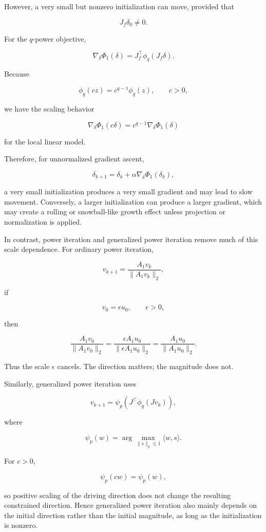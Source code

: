 \documentclass{article}
\begin{document}
However, a very small but nonzero initialization can move, provided that

\[
J_f\delta_0\neq0.
\]

For the \(q\)-power objective,

\[
\nabla_\delta \Phi_1(\delta)
=
J_f^\top\phi_q(J_f\delta).
\]

Because

\[
\phi_q(cz)=c^{q-1}\phi_q(z),
\qquad c>0,
\]

we have the scaling behavior

\[
\nabla_\delta\Phi_1(c\delta)
=
c^{q-1}\nabla_\delta\Phi_1(\delta)
\]

for the local linear model.

Therefore, for unnormalized gradient ascent,

\[
\delta_{k+1}
=
\delta_k+\alpha\nabla_\delta\Phi_1(\delta_k),
\]

a very small initialization produces a very small gradient and may lead to slow movement. Conversely, a larger initialization can produce a larger gradient, which may create a rolling or snowball-like growth effect unless projection or normalization is applied.

In contrast, power iteration and generalized power iteration remove much of this scale dependence. For ordinary power iteration,

\[
v_{k+1}
=
\frac{A_1v_k}{\|A_1v_k\|_2},
\]

if

\[
v_0=\epsilon u_0,
\qquad
\epsilon>0,
\]

then

\[
\frac{A_1v_0}{\|A_1v_0\|_2}
=
\frac{\epsilon A_1u_0}{\|\epsilon A_1u_0\|_2}
=
\frac{A_1u_0}{\|A_1u_0\|_2}.
\]

Thus the scale \(\epsilon\) cancels. The direction matters; the magnitude does not.

Similarly, generalized power iteration uses

\[
v_{k+1}
=
\psi_p
\left(
J^\top\phi_q(Jv_k)
\right),
\]

where

\[
\psi_p(w)
=
\arg\max_{\|s\|_p\le1}\langle w,s\rangle.
\]

For \(c>0\),

\[
\psi_p(cw)=\psi_p(w),
\]

so positive scaling of the driving direction does not change the resulting constrained direction. Hence generalized power iteration also mainly depends on the initial direction rather than the initial magnitude, as long as the initialization is nonzero.
\end{document}
